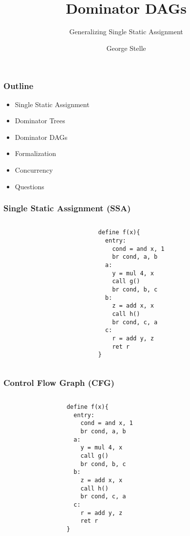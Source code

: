 \documentclass[usenames,dvipsnames]{beamer}
\title{Dominator DAGs}
\subtitle{Generalizing Single Static Assignment}
\author[shortname]{George Stelle}
\institute[shortinst]{Los Alamos National Laboratory}
\begin{document}
\begin{frame}
\maketitle
\end{frame}

\begin{frame}
\frametitle{Outline}
\begin{itemize}
\item Single Static Assignment
\item Dominator Trees
\item Dominator DAGs
\item Formalization 
\item Concurrency
\item Questions
\end{itemize}
\end{frame}

\begin{frame}[fragile]
\frametitle{Single Static Assignment (SSA)}
\begin{columns}
\begin{column}{0.35\textwidth}\end{column}
\begin{column}{0.9\textwidth}
\begin{lstlisting}
define f(x){
  entry:
    cond = and x, 1
    br cond, a, b
  a: 
    y = mul 4, x
    call g()
    br cond, b, c 
  b:
    z = add x, x
    call h()
    br cond, c, a
  c: 
    r = add y, z
    ret r
}
\end{lstlisting}
\end{column}
\end{columns}
\end{frame}

\begin{frame}[fragile]
\frametitle{Control Flow Graph (CFG)}
\begin{columns}
\begin{column}{0.1\textwidth}
\end{column}
\begin{column}{0.4\textwidth}
\begin{lstlisting}
define f(x){
  entry:
    cond = and x, 1
    br cond, a, b
  a: 
    y = mul 4, x
    call g()
    br cond, b, c 
  b:
    z = add x, x
    call h()
    br cond, c, a
  c: 
    r = add y, z
    ret r
}
\end{lstlisting}
\end{column}
\begin{column}{0.5\textwidth}
\center
{}
\end{column}
\end{columns}
\end{frame}
\end{document}

